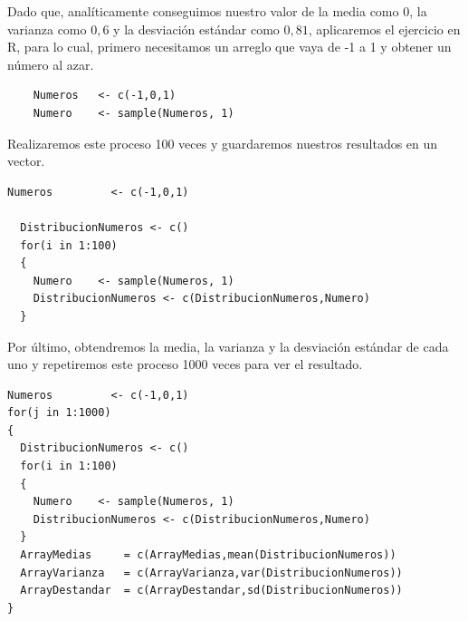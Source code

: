 \documentclass[]{article}
\begin{document}
Dado que, analíticamente conseguimos nuestro valor de la media como $0$, la varianza como $0,6$ y la desviación estándar como $0,81$, aplicaremos el ejercicio en R, para lo cual, primero necesitamos un arreglo que vaya de -1 a 1 y obtener un número al azar.
      \begin{lstlisting}
    Numeros   <- c(-1,0,1)
    Numero    <- sample(Numeros, 1)

      \end{lstlisting}
      
Realizaremos este proceso 100 veces y guardaremos nuestros resultados en un vector.
      \begin{lstlisting}
Numeros         <- c(-1,0,1)

  DistribucionNumeros <- c()
  for(i in 1:100)
  {
    Numero    <- sample(Numeros, 1)
    DistribucionNumeros <- c(DistribucionNumeros,Numero)
  }

      \end{lstlisting}
      
Por último, obtendremos la media, la varianza y la desviación estándar de cada uno y repetiremos este proceso 1000 veces para ver el resultado.

      \begin{lstlisting}
Numeros         <- c(-1,0,1)
for(j in 1:1000)
{
  DistribucionNumeros <- c()
  for(i in 1:100)
  {
    Numero    <- sample(Numeros, 1)
    DistribucionNumeros <- c(DistribucionNumeros,Numero)
  }
  ArrayMedias     = c(ArrayMedias,mean(DistribucionNumeros))
  ArrayVarianza   = c(ArrayVarianza,var(DistribucionNumeros))
  ArrayDestandar  = c(ArrayDestandar,sd(DistribucionNumeros))
}

      \end{lstlisting}
      
\end{document}
